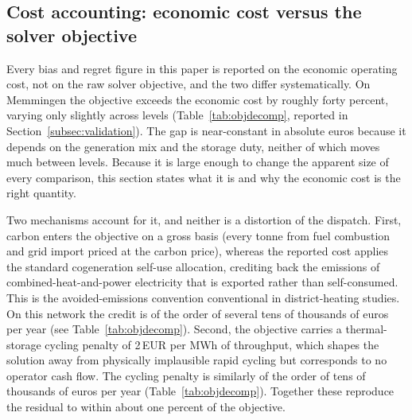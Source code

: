 

\subsection{Cost accounting: economic cost versus the solver objective}
\label{subsec:costacct}
Every bias and regret figure in this paper is reported on the economic operating cost, not on
the raw solver objective, and the two differ systematically. On Memmingen the objective
exceeds the economic cost by roughly forty percent, varying only slightly across levels
(Table~\ref{tab:objdecomp}, reported in Section~\ref{subsec:validation}). The gap is
near-constant in absolute euros because it depends on the generation mix and the storage
duty, neither of which moves much between levels. Because it is large enough to change the
apparent size of every comparison, this section states what it is and why the economic cost
is the right quantity. 

Two mechanisms account for it, and neither is a distortion of the dispatch. First, carbon enters
the objective on a gross basis (every tonne from fuel combustion and grid import priced at the
carbon price), whereas the reported cost applies the standard cogeneration self-use allocation,
crediting back the emissions of combined-heat-and-power electricity that is exported rather than
self-consumed. This is the avoided-emissions convention conventional in district-heating studies.
On this network the credit is of the order of several tens of thousands of euros per year (see
Table~\ref{tab:objdecomp}). Second, the objective carries a thermal-storage cycling penalty of
2\,EUR per MWh of throughput, which shapes the solution away from physically implausible rapid
cycling but corresponds to no operator cash flow. The cycling penalty is similarly of the order of
tens of thousands of euros per year (Table~\ref{tab:objdecomp}). Together these reproduce the
residual to within about one percent of the objective.

